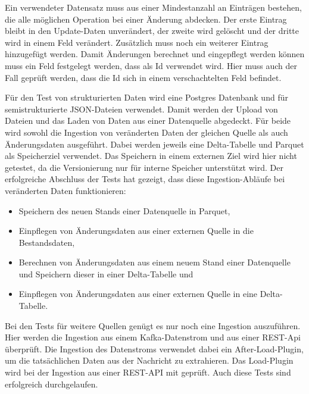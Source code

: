 Ein verwendeter Datensatz muss aus einer Mindestanzahl an Einträgen bestehen, die alle möglichen Operation bei einer Änderung abdecken.
Der erste Eintrag bleibt in den Update-Daten unverändert, der zweite wird gelöscht und der dritte wird in einem Feld verändert.
Zusätzlich muss noch ein weiterer Eintrag hinzugefügt werden.
Damit Änderungen berechnet und eingepflegt werden können muss ein Feld festgelegt werden, dass als Id verwendet wird.
Hier muss auch der Fall geprüft werden, dass die Id sich in einem verschachtelten Feld befindet.

Für den Test von strukturierten Daten wird eine Postgres Datenbank und für semistrukturierte JSON-Dateien verwendet.
Damit werden der Upload von Dateien und das Laden von Daten aus einer Datenquelle abgedeckt.
Für beide wird sowohl die Ingestion von veränderten Daten der gleichen Quelle als auch Änderungsdaten ausgeführt.
Dabei werden jeweils eine Delta-Tabelle und Parquet als Speicherziel verwendet.
Das Speichern in einem externen Ziel wird hier nicht getestet, da die Versionierung nur für interne Speicher unterstützt wird.
Der erfolgreiche Abschluss der Tests hat gezeigt, dass diese Ingestion-Abläufe bei veränderten Daten funktionieren: \begin{itemize}
    \item Speichern des neuen Stands einer Datenquelle in Parquet,
    \item Einpflegen von Änderungsdaten aus einer externen Quelle in die Bestandsdaten,
    \item Berechnen von Änderungsdaten aus einem neuem Stand einer Datenquelle und Speichern dieser in einer Delta-Tabelle und
    \item Einpflegen von Änderungsdaten aus einer externen Quelle in eine Delta-Tabelle.
\end{itemize}

Bei den Tests für weitere Quellen genügt es nur noch eine Ingestion auszuführen.
Hier werden die Ingestion aus einem Kafka-Datenstrom und aus einer REST-Api überprüft.
Die Ingestion des Datenstroms verwendet dabei ein After-Load-Plugin, um die tatsächlichen Daten aus der Nachricht zu extrahieren.
Das Load-Plugin wird bei der Ingestion aus einer REST-API mit geprüft.
Auch diese Tests sind erfolgreich durchgelaufen.
